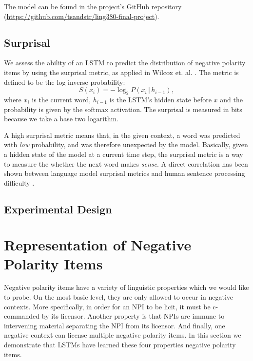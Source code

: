 \documentclass[11pt, round]{article}
\begin{document}
The model can be found in the project's GitHub repository (\url{https://github.com/tsandstr/ling380-final-project}).

\subsection{Surprisal}

We assess the ability of an LSTM to predict the distribution of negative polarity items by using the surprisal metric, as applied in Wilcox et. al. . The metric is defined to be the log inverse probability:
\[ S(x_i) = -\log_2 P(x_i \, | \, h_{i-1}), \]
where $x_i$ is the current word, $h_{i-1}$ is the LSTM's hidden state before $x$ and the probability is given by the softmax activation. The surprisal is measured in bits because we take a base two logarithm.

A high surprisal metric means that, in the given context, a word was predicted with \textit{low} probability, and was therefore unexpected by the model. Basically, given a hidden state of the model at a current time step, the surprisal metric is a way to measure the whether the next word makes \textit{sense}. A direct correlation has been shown between language model surprisal metrics and  human sentence processing difficulty \cite{hale2001probabilistic,levy2008expectation,smith2013effect}. 

\subsection{Experimental Design}

\section{Representation of Negative Polarity Items}

Negative polarity items have a variety of linguistic properties which we would like to probe. On the most basic level, they are only allowed to occur in negative contexts. More specifically, in order for an NPI to be licit, it must be c-commanded by its licensor. Another property is that NPIs are immune to intervening material separating the NPI from its licensor. And finally, one negative context can license multiple negative polarity items. In this section we demonstrate that LSTMs have learned these four properties negative polarity items.
\end{document}
